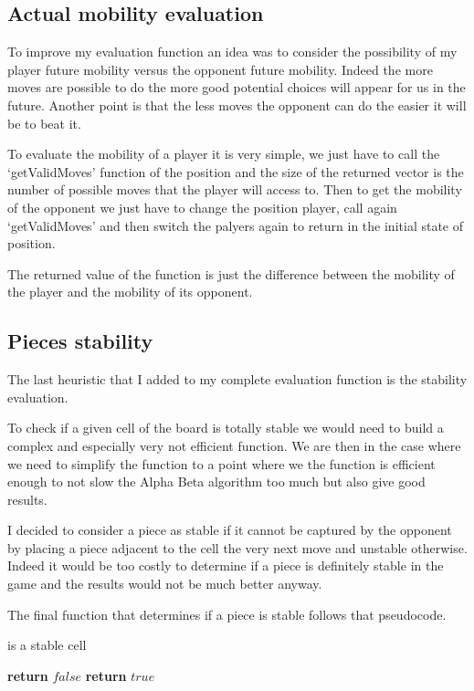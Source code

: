 \subsection{Actual mobility evaluation}

To improve my evaluation function an idea was to consider the possibility of my player future mobility versus the opponent future mobility.
Indeed the more moves are possible to do the more good potential choices will appear for us in the future.
Another point is that the less moves the opponent can do the easier it will be to beat it.

To evaluate the mobility of a player it is very simple, we just have to call the `getValidMoves' function of the position and the size of the returned vector is the number of possible moves that the player will access to.
Then to get the mobility of the opponent we just have to change the position player, call again `getValidMoves' and then switch the palyers again to return in the initial state of position.

The returned value of the function is just the difference between the mobility of the player and the mobility of its opponent.

\subsection{Pieces stability}

The last heuristic that I added to my complete evaluation function is the stability evaluation.

To check if a given cell of the board is totally stable we would need to build a complex and especially very not efficient function.
We are then in the case where we need to simplify the function to a point where we the function is efficient enough to not slow the Alpha Beta algorithm too much but also give good results.

I decided to consider a piece as stable if it cannot be captured by the opponent by placing a piece adjacent to the cell the very next move and unstable otherwise.
Indeed it would be too costly to determine if a piece is definitely stable in the game and the results would not be much better anyway.

The final function that determines if a piece is stable follows that pseudocode.

\FloatBarrier
\begin{algorithm}
    \caption{is a stable cell}
    \begin{algorithmic}[1]
                        \State \textbf{return} $false$
                    \EndIf
                \EndIf
            \EndFor
            \State \textbf{return} $true$
        \EndProcedure
    \end{algorithmic}
\end{algorithm}
\FloatBarrier

